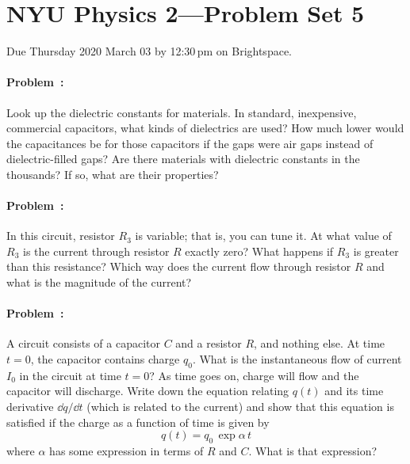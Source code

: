 \documentclass[12pt]{article}
\begin{document}
\section*{NYU Physics 2---Problem Set 5}

Due Thursday 2020 March 03 by 12:30\,pm on Brightspace.

\paragraph{Problem~\theproblem:}%
Look up the dielectric constants for materials.
In standard, inexpensive, commercial capacitors, what kinds of dielectrics are used?
How much lower would the capacitances be for those capacitors if the gaps were air gaps instead
of dielectric-filled gaps?
Are there materials with dielectric constants in the thousands? If so, what are their properties?

\paragraph{Problem~\theproblem:}%
In this circuit, resistor $R_3$ is variable; that is, you can tune it. At what value of $R_3$
is the current through resistor $R$ exactly zero? What happens if $R_3$ is
greater than this resistance? Which way does the current flow through resistor $R$ and what is
the magnitude of the current?

\paragraph{Problem~\theproblem:}%
A circuit consists of a capacitor $C$ and a resistor $R$,
and nothing else.
At time $t=0$, the capacitor contains charge $q_0$.
What is the instantaneous flow of current $I_0$ in the circuit at time $t=0$?
As time goes on, charge will flow and the capacitor will discharge.
Write down the equation relating $q(t)$ and its time derivative $\dd q/\dd t$ (which
is related to the current) and show that this equation is satisfied if the charge
as a function of time is given by
\begin{equation}
q(t) = q_0\,\exp \alpha\,t
\end{equation}
where $\alpha$ has some expression in terms of $R$ and $C$. What is that expression?
\end{document}

